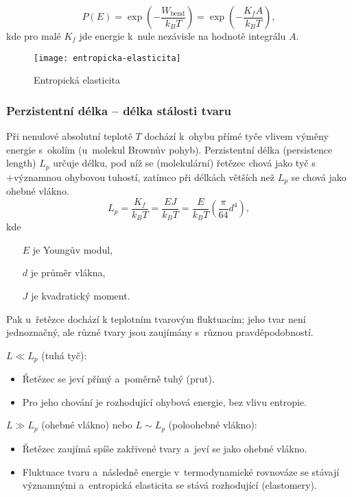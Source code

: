 \begin{equation}
	P(E)
	= \exp\left(-\frac{W_\text{bend}}{k_B T}\right)
	= \exp\left(-\frac{K_f A}{k_B T}\right),
\end{equation}
kde pro malé $K_f$ jde energie k~nule nezávisle na hodnotě integrálu $A$.

\begin{figure}[H]
	\centering
	\texttt{[image: entropicka-elasticita]}
	\caption{Entropická elasticita}
	\label{fig:entropicka-elasticita}
\end{figure}

\subsubsection{Perzistentní délka -- délka stálosti tvaru}
Při nenulové absolutní teplotě $T$ dochází k~ohybu přímé tyče vlivem výměny energie s~okolím (u~molekul Brownův pohyb).
Perzistentní délka (persistence length) $L_p$ určuje délku, pod níž se (molekulární) řetězec chová jako tyč s +významnou ohybovou tuhostí, zatímco při délkách větších než $L_p$ se chová jako ohebné vlákno.
\begin{equation}
	L_p = \frac{K_f}{k_B T} = \frac{E J}{k_B T} = \frac{E}{k_B T} \left(\frac{\pi}{64} d^4\right),
\end{equation}
kde
\begin{itemize}
	\item[$E$] je Youngův modul,
	\item[$d$] je průměr vlákna,
	\item[$J$] je kvadratický moment.
\end{itemize}
Pak u~řetězce dochází k teplotním tvarovým fluktuacím; jeho tvar není jednoznačný, ale různé tvary jsou zaujímány s~různou pravděpodobností.

$L \ll L_p$ (tuhá tyč):
\begin{itemize}
	\item Řetězec se jeví přímý a~poměrně tuhý (prut).
	\item Pro jeho chování je rozhodující ohybová energie, bez vlivu entropie.
\end{itemize}

$L \gg L_p$ (ohebné vlákno) nebo $L \sim L_p$ (poloohebné vlákno):
\begin{itemize}
	\item Řetězec zaujímá spíše zakřivené tvary a~jeví se jako ohebné vlákno.
	\item Fluktuace tvaru a~následně energie v~termodynamické rovnováze se stávají významnými a~entropická elasticita se stává rozhodující (elastomery).
\end{itemize}

